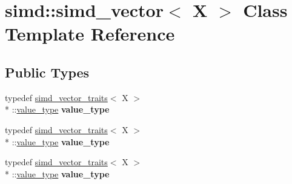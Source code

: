 \hypertarget{classsimd_1_1simd__vector}{\section{simd\+:\+:simd\+\_\+vector$<$ X $>$ Class Template Reference}
\label{classsimd_1_1simd__vector}
}
\subsection*{Public Types}
\begin{DoxyCompactItemize}
\item 
\hypertarget{classsimd_1_1simd__vector_a20d2651dc183631916b96f4938c5d5fe}{typedef \hyperlink{structsimd_1_1simd__vector__traits}{simd\+\_\+vector\+\_\+traits}$<$ X $>$\\*
\+::\hyperlink{classsimd_1_1vector2d}{value\+\_\+type} {\bfseries value\+\_\+type}}\label{classsimd_1_1simd__vector_a20d2651dc183631916b96f4938c5d5fe}

\item 
\hypertarget{classsimd_1_1simd__vector_a20d2651dc183631916b96f4938c5d5fe}{typedef \hyperlink{structsimd_1_1simd__vector__traits}{simd\+\_\+vector\+\_\+traits}$<$ X $>$\\*
\+::\hyperlink{classsimd_1_1vector2d}{value\+\_\+type} {\bfseries value\+\_\+type}}\label{classsimd_1_1simd__vector_a20d2651dc183631916b96f4938c5d5fe}

\item 
\hypertarget{classsimd_1_1simd__vector_a20d2651dc183631916b96f4938c5d5fe}{typedef \hyperlink{structsimd_1_1simd__vector__traits}{simd\+\_\+vector\+\_\+traits}$<$ X $>$\\*
\+::\hyperlink{classsimd_1_1vector2d}{value\+\_\+type} {\bfseries value\+\_\+type}}\label{classsimd_1_1simd__vector_a20d2651dc183631916b96f4938c5d5fe}

\end{DoxyCompactItemize}
